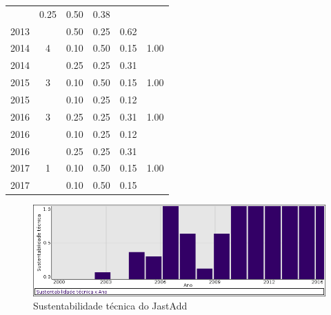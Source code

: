 \begin{table}[H]
\begin{tabular}{| l | c | c | c | c | c |}
          &
          0.25
          &
          0.50
          &
          0.38
          &
          \\
            2013
          &
          
          &
          0.50
          &
          0.25
          &
          0.62
          &
          \\
\hline
            2014
          &
          4
          &
          0.10
          &
          0.50
          &
          0.15
          &
            {\color{blue} 1.00}
          \\
            2014
          &
          
          &
          0.25
          &
          0.25
          &
          0.31
          &
          \\
\hline
            2015
          &
          3
          &
          0.10
          &
          0.50
          &
          0.15
          &
            {\color{blue} 1.00}
          \\
            2015
          &
          
          &
          0.10
          &
          0.25
          &
          0.12
          &
          \\
\hline
            2016
          &
          3
          &
          0.25
          &
          0.25
          &
          0.31
          &
            {\color{blue} 1.00}
          \\
            2016
          &
          
          &
          0.10
          &
          0.25
          &
          0.12
          &
          \\
            2016
          &
          
          &
          0.25
          &
          0.25
          &
          0.31
          &
          \\
\hline
            2017
          &
          1
          &
          0.10
          &
          0.50
          &
          0.15
          &
            {\color{blue} 1.00}
          \\
            2017
          &
          
          &
          0.10
          &
          0.50
          &
          0.15
          &
          \\
\hline
\end{tabular}
\end{table}

\begin{figure}[h]
  \center
  \includegraphics[scale=0.50]{imagens/softwares-charts/jastadd.png}
  \caption{Sustentabilidade técnica do JastAdd}
\end{figure}


